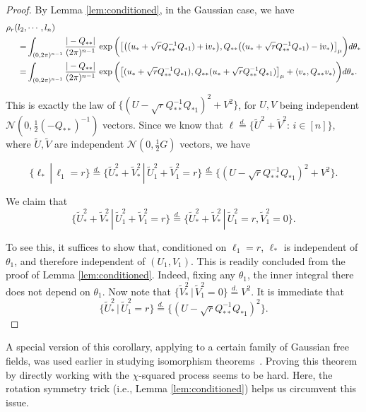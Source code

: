 \documentclass[a4paper, 11pt]{article}
\newcommand{\compi}{\textnormal{i}}
\begin{document}
\begin{proof}
By Lemma \ref{lem:conditioned}, in the Gaussian case, we have
\begin{equation*}
\begin{aligned}
\rho_r(l_2, & \cdots, l_n)\\
=& \int_{(0,2\pi)^{n-1}}\frac{|-Q_{**}|}{(2\pi)^{n-1}}\,
\exp\bigg(\big[ \big((u_*+ \sqrt{r}Q_{**}^{-1}Q_{*1})+\compi v_*\big), Q_{**}\big((u_*+ \sqrt{r}Q_{**}^{-1}Q_{*1})-\compi v_*\big)\big]_\mu\bigg)d\theta_*\\
=& \int_{(0,2\pi)^{n-1}}\frac{|-Q_{**}|}{(2\pi)^{n-1}}\,
\exp\bigg(\big[ (u_*+ \sqrt{r}Q_{**}^{-1}Q_{*1}), Q_{**}(u_*+ \sqrt{r}Q_{**}^{-1}Q_{*1})\big]_\mu+\langle v_*, Q_{**}v_*\rangle\bigg)d\theta_*.
\end{aligned}
\end{equation*}

This is exactly the law of $\big\{(U-\sqrt{r}Q_{**}^{-1}Q_{*1})^2+V^2\big\}$, for $U, V$ being independent $\mathcal{N}(0,\frac{1}{2}(-Q_{**})^{-1})$ vectors. Since we know that $\ell\stackrel{d.}{=} \{\tilde{U}^2+\tilde{V}^2:\,i\in[n]\}$, where $\tilde{U}, \tilde{V}$ are independent $\mathcal{N}(0,\frac{1}{2}G)$ vectors, we have

\[\{\ell_*\,|\,\ell_1=r\}\stackrel{d.}{=} \{\tilde{U}_*^2+\tilde{V}_*^2\,|\, \tilde{U}_1^2+\tilde{V}_1^2=r\}\stackrel{d.}{=} \big\{(U-\sqrt{r}Q_{**}^{-1}Q_{*1})^2+V^2\big\}.\]

We claim that
\[\{\tilde{U}_*^2+\tilde{V}_*^2\,|\, \tilde{U}_1^2+\tilde{V}_1^2=r\}\stackrel{d.}{=}\{\tilde{U}_*^2+\tilde{V}_*^2\,|\, \tilde{U}_1^2=r,\tilde{V}_1^2=0\}.\]

To see this, it suffices to show that, conditioned on $\ell_1=r$,  $\ell_*$ is independent of $\theta_1$, and therefore independent of $(U_1, V_1)$. This is readily concluded from the proof of Lemma \ref{lem:conditioned}. Indeed, fixing any $\theta_1$, the inner integral there does not depend on $\theta_1$. Now note that $\{\tilde{V}_*^2\,|\,\tilde{V}_1^2=0\}\stackrel{d.}{=}V^2$. It is immediate that
\[\{\tilde{U}_*^2\,|\, \tilde{U}_1^2=r\}\stackrel{d.}{=}\big\{(U-\sqrt{r}Q_{**}^{-1}Q_{*1})^2\big\}.\]
\end{proof}

A special version of this corollary, applying to a certain family of Gaussian free fields, was used earlier in studying isomorphism theorems~\cite{sznitman12}. Proving this theorem by directly working with the $\chi$-squared process seems to be hard. Here, the rotation symmetry trick (i.e., Lemma \ref{lem:conditioned}) helps us circumvent this issue.
\end{document}
